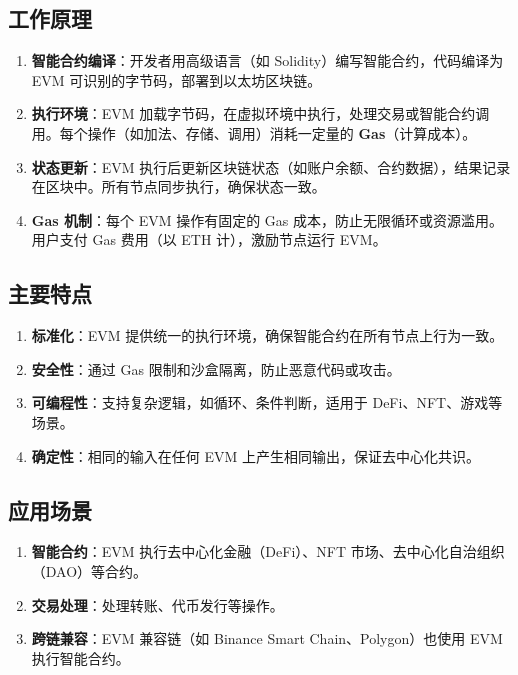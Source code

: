 \documentclass[12pt]{ctexart}
\begin{document}
\subsection{工作原理}
\begin{enumerate}
    \item \textbf{智能合约编译}：开发者用高级语言（如 Solidity）编写智能合约，代码编译为 EVM 可识别的字节码，部署到以太坊区块链。
    \item \textbf{执行环境}：EVM 加载字节码，在虚拟环境中执行，处理交易或智能合约调用。每个操作（如加法、存储、调用）消耗一定量的 \textbf{Gas}（计算成本）。
    \item \textbf{状态更新}：EVM 执行后更新区块链状态（如账户余额、合约数据），结果记录在区块中。所有节点同步执行，确保状态一致。
    \item \textbf{Gas 机制}：每个 EVM 操作有固定的 Gas 成本，防止无限循环或资源滥用。用户支付 Gas 费用（以 ETH 计），激励节点运行 EVM。
\end{enumerate}

\subsection{主要特点}
\begin{enumerate}
    \item \textbf{标准化}：EVM 提供统一的执行环境，确保智能合约在所有节点上行为一致。
    \item \textbf{安全性}：通过 Gas 限制和沙盒隔离，防止恶意代码或攻击。
    \item \textbf{可编程性}：支持复杂逻辑，如循环、条件判断，适用于 DeFi、NFT、游戏等场景。
    \item \textbf{确定性}：相同的输入在任何 EVM 上产生相同输出，保证去中心化共识。
\end{enumerate}

\subsection{应用场景}
\begin{enumerate}
    \item \textbf{智能合约}：EVM 执行去中心化金融（DeFi）、NFT 市场、去中心化自治组织（DAO）等合约。
    \item \textbf{交易处理}：处理转账、代币发行等操作。
    \item \textbf{跨链兼容}：EVM 兼容链（如 Binance Smart Chain、Polygon）也使用 EVM 执行智能合约。
\end{enumerate}
\end{document}
